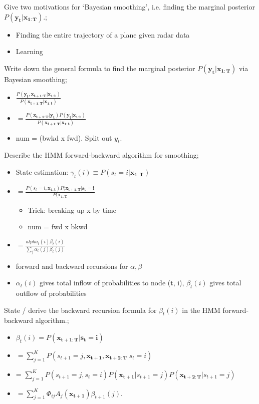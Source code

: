 \documentclass{article}
\begin{document}
Give two motivations for `Bayesian smoothing', i.e. finding the marginal posterior $P(\mathbf{y_t|x_{1:T}})$.; \begin{itemize}
    \item Finding the entire trajectory of a plane given radar data
    \item Learning
\end{itemize}

Write down the general formula to find the marginal posterior $P(\mathbf{y_t|x_{1:T}})$ via Bayesian smoothing; \begin{itemize}
    \item $\frac{P(\mathbf{y_t, x_{t+1:T}|x_{1:t}})}{P(\mathbf{x_{t+1:T}|x_{1:t}})}$
    \item $=\frac{P(\mathbf{x_{t+1:T}|y_t})P(\mathbf{y_t|x_{1:t}})}{P(\mathbf{x_{t+1:T}|x_{1:t}})}$
    \item num = (bwkd x fwd). Split out $y_t$.
\end{itemize}

Describe the HMM forward-backward algorithm for smoothing;
\begin{itemize}
    \item State estimation: $\gamma_t(i)\equiv P(s_t=i|\mathbf{x_{1:T}})$
    \item $=\frac{P(s_t=i, \mathbf{x_{1:t}})P(\mathbf{x_{t+1:T}|s_t=i}}{P(\mathbf{x_{1:T}}}$
    \begin{itemize}
        \item Trick: breaking up x by time
        \item num = fwd x bkwd
    \end{itemize}
    \item $=\frac{alpha_t(i)\beta_t(i)}{\sum_j\alpha_t(j)\beta_t(j)}$
    \item forward and backward recursions for $\alpha, \beta$
    \item $\alpha_t(i)$ gives total inflow of probabilities to node (t, i), $\beta_t(i)$ gives total outflow of probabilities
\end{itemize}
State / derive the backward recursion formula for $\beta_t(i)$ in the HMM forward-backward algorithm.; \begin{itemize}
    \item $\beta_t(i)=P(\mathbf{x_{t+1:T}|s_t=i})$
    \item $=\sum_{j=1}^K P(s_{t+1}=j, \mathbf{x_{t+1},  x_{t+2:T}}|s_t=i)$
    \item = $\sum_{j=1}^K P(s_{t+1}=j, s_t=i) P(\mathbf{x_{t+1}}|s_{t+1}=j)P(\mathbf{x_{t+2:T}}|s_{t+1}=j)$
    \item $=\sum_{j=1}^K\Phi_{ij}A_j(\mathbf{x_{t+1}})\beta_{t+1}(j)$.
\end{itemize}
\end{document}
